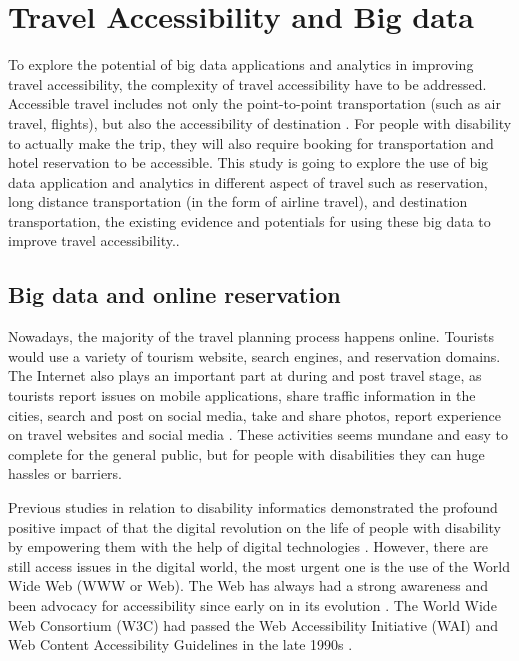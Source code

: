 \section{Travel Accessibility and Big data}
To explore the potential of big data applications and analytics in improving travel 
accessibility, the complexity of travel accessibility have to be addressed. 
Accessible travel includes not only the point-to-point transportation (such as air
travel, flights), but also the accessibility of destination \cite{Ama,DARCY2010816,milo}.
For people with disability to actually make the trip, they will also require booking for
transportation and hotel reservation to be accessible. This study is going to 
explore the use of big data application and analytics in different aspect of 
travel such as reservation, long distance 
transportation (in the form of airline travel), and destination transportation,
the existing evidence and potentials for using these big data to improve travel 
accessibility.. 

\subsection{Big data and online reservation}
Nowadays, the majority of the travel planning process happens online. Tourists would
use a variety of tourism website, search engines, and reservation domains. The 
Internet also plays an important part at during and post travel stage, as tourists 
report issues on mobile applications, share traffic information in the cities, 
search and post on social media, take and share photos, report experience on 
travel websites and social media \cite{akerkar2012, Shafiee16}. These activities 
seems mundane and easy to complete for the general public, but for people with 
disabilities they can huge hassles or barriers.

Previous studies in relation to disability informatics  demonstrated 
the profound positive impact of  that the digital revolution on the life
of people with disability by empowering them with the help of digital 
technologies \cite{Appleyard2005}. However, there are still access issues 
in the digital world, the most urgent one is the use of the World Wide Web 
(WWW or Web). The Web has always had a strong awareness and been advocacy 
for accessibility since early on in its evolution \cite{Appleyard2005}. 
The World Wide Web Consortium (W3C) had passed the Web Accessibility Initiative
(WAI) and Web Content Accessibility Guidelines in the late 1990s \cite{Appleyard2005}. 

